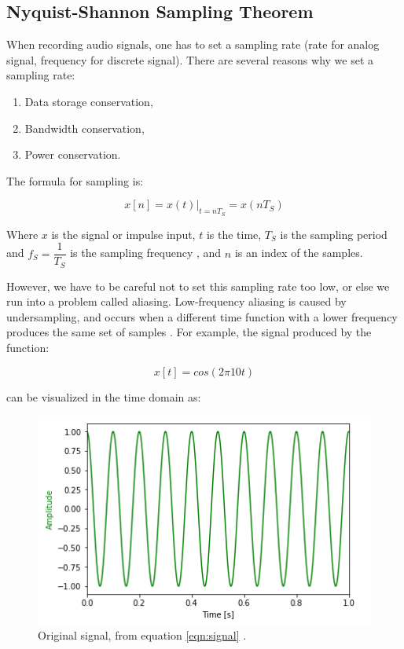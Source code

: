 \subsection{Nyquist-Shannon Sampling Theorem}

When recording audio signals, one has to set a sampling rate
(rate for analog signal, frequency for discrete signal). There
are several reasons why we set a sampling rate:

\begin{enumerate}
	\item Data storage conservation,
	\item Bandwidth conservation,
	\item Power conservation.
\end{enumerate}

The formula for sampling is:

\begin{equation}
	x[n]=x(t)|_{t=nT_{S}}=x(nT_{S})
	\label{eqn:signal}
\end{equation}

Where $x$ is the signal or impulse input, $t$ is the time, \(T_{S}\) is the sampling period and \(f_{S}=
\dfrac{1}{T_{S}}\) is the sampling frequency 
\cite{notes:class}, and $n$ is an index of the samples.

However, we have to be careful not to set this sampling rate too
low, or else we run into a problem called aliasing. Low-frequency
aliasing is caused by undersampling, and occurs when a different
time function with a lower frequency produces the same set of
samples \cite{aliase:wiki}. For example, the signal produced by
the function:

\begin{equation}
	x[t]=cos(2\pi10t)
\end{equation}

can be visualized in the time domain as:

\begin{figure}[H]
	\centering
	\includegraphics[scale = 1]{images/original_signal.png} %
	\caption{Original signal, from equation \ref{eqn:signal} \cite{notebook:sampling}.}
	\label{fig:signal_og}
\end{figure}    

